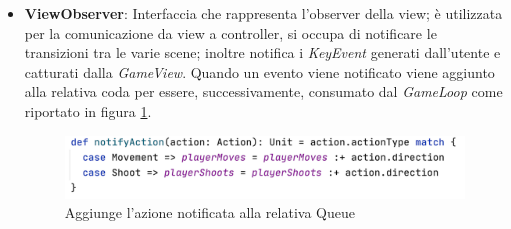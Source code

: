 \begin{itemize}
    \item \textbf{ViewObserver}: Interfaccia che rappresenta l'observer della view; è utilizzata per la comunicazione da view a controller, si occupa di notificare le transizioni tra le varie scene; inoltre notifica i \textit{KeyEvent} generati dall'utente e catturati dalla \textit{GameView}. Quando un evento viene notificato viene aggiunto alla relativa coda per essere, successivamente, consumato dal \textit{GameLoop} come riportato in figura \ref{notifyAction}.
    \begin{figure}[H]
      \includegraphics[width=15cm]{res/notifyAction.png}
      \caption{Aggiunge l'azione notificata alla relativa Queue}
      \label{notifyAction}
    \end{figure}
 \end{itemize}
 






